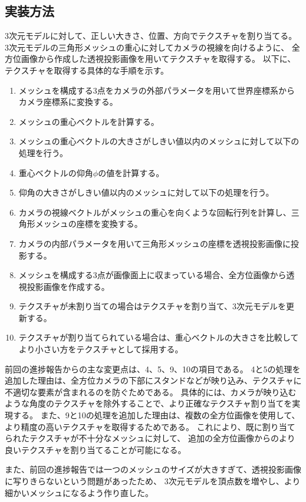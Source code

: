 \documentclass[]{jarticle}          %
\begin{document}
\subsection{実装方法}
3次元モデルに対して、正しい大きさ、位置、方向でテクスチャを割り当てる。
3次元モデルの三角形メッシュの重心に対してカメラの視線を向けるように、
全方位画像から作成した透視投影画像を用いてテクスチャを取得する。
以下に、テクスチャを取得する具体的な手順を示す。
\begin{enumerate}
  \item メッシュを構成する3点をカメラの外部パラメータを用いて世界座標系からカメラ座標系に変換する。
  \item メッシュの重心ベクトルを計算する。
  \item メッシュの重心ベクトルの大きさがしきい値以内のメッシュに対して以下の処理を行う。
  \item 重心ベクトルの仰角$\phi$の値を計算する。
  \item 仰角の大きさがしきい値以内のメッシュに対して以下の処理を行う。
  \item カメラの視線ベクトルがメッシュの重心を向くような回転行列を計算し、三角形メッシュの座標を変換する。
  \item カメラの内部パラメータを用いて三角形メッシュの座標を透視投影画像に投影する。
  \item メッシュを構成する3点が画像面上に収まっている場合、全方位画像から透視投影画像を作成する。
  \item テクスチャが未割り当ての場合はテクスチャを割り当て、3次元モデルを更新する。
  \item テクスチャが割り当てられている場合は、重心ベクトルの大きさを比較してより小さい方をテクスチャとして採用する。
\end{enumerate}
前回の進捗報告からの主な変更点は、4、5、9、10の項目である。
4と5の処理を追加した理由は、全方位カメラの下部にスタンドなどが映り込み、テクスチャに不適切な要素が含まれるのを防ぐためである。
具体的には、カメラが映り込むような角度のテクスチャを除外することで、より正確なテクスチャ割り当てを実現する。
また、9と10の処理を追加した理由は、複数の全方位画像を使用して、より精度の高いテクスチャを取得するためである。
これにより、既に割り当てられたテクスチャが不十分なメッシュに対して、
追加の全方位画像からのより良いテクスチャを割り当てることが可能になる。

また、前回の進捗報告では一つのメッシュのサイズが大きすぎて、透視投影画像に写りきらないという問題があったため、
3次元モデルを頂点数を増やし、より細かいメッシュになるよう作り直した。
\end{document}
